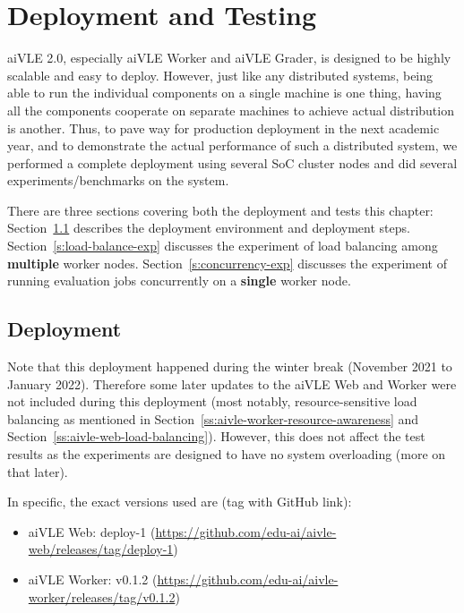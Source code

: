 \chapter{Deployment and Testing}
\label{ch:deployment-and-testing}
aiVLE 2.0, especially aiVLE Worker and aiVLE Grader, is designed to be highly scalable and easy to deploy. However, just like any distributed systems, being able to run the individual components on a single machine is one thing, having all the components cooperate on separate machines to achieve actual distribution is another. Thus, to pave way for production deployment in the next academic year, and to demonstrate the actual performance of such a distributed system, we performed a complete deployment using several SoC cluster nodes and did several experiments/benchmarks on the system.

There are three sections covering both the deployment and tests this chapter: Section~\ref{s:deployment} describes the deployment environment and deployment steps. Section~\ref{s:load-balance-exp} discusses the experiment of load balancing among \textbf{multiple} worker nodes. Section~\ref{s:concurrency-exp} discusses the experiment of running evaluation jobs concurrently on a \textbf{single} worker node.

\section{Deployment}
\label{s:deployment}
Note that this deployment happened during the winter break (November 2021 to January 2022). Therefore some later updates to the aiVLE Web and Worker were not included during this deployment (most notably, resource-sensitive load balancing as mentioned in Section~\ref{ss:aivle-worker-resource-awareness} and Section~\ref{ss:aivle-web-load-balancing}). However, this does not affect the test results as the experiments are designed to have no system overloading (more on that later).

In specific, the exact versions used are (tag with GitHub link):
\begin{itemize}
    \item aiVLE Web: deploy-1 (\href{https://github.com/edu-ai/aivle-web/releases/tag/deploy-1}{https://github.com/edu-ai/aivle-web/releases/tag/deploy-1})
    \item aiVLE Worker: v0.1.2 (\href{https://github.com/edu-ai/aivle-worker/releases/tag/v0.1.2}{https://github.com/edu-ai/aivle-worker/releases/tag/v0.1.2})
\end{itemize}

